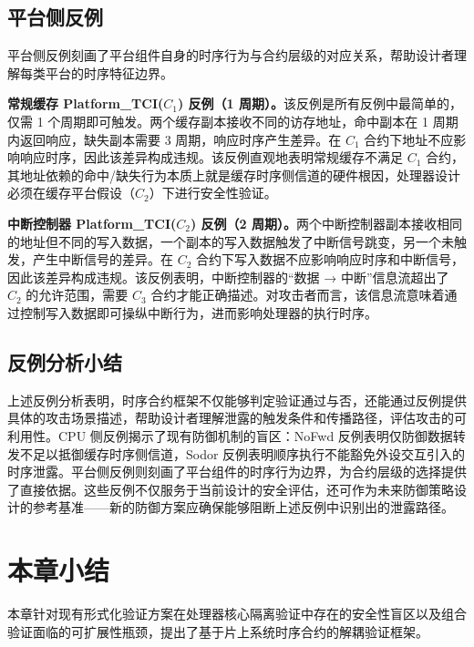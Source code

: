 \subsection{平台侧反例}
\label{subsec:ch4_cex_platform}

平台侧反例刻画了平台组件自身的时序行为与合约层级的对应关系，帮助设计者理解每类平台的时序特征边界。

\textbf{常规缓存 Platform\_TCI($C_1$) 反例（1 周期）。}该反例是所有反例中最简单的，仅需 1 个周期即可触发。两个缓存副本接收不同的访存地址，命中副本在 1 周期内返回响应，缺失副本需要 3 周期，响应时序产生差异。在 $C_1$ 合约下地址不应影响响应时序，因此该差异构成违规。该反例直观地表明常规缓存不满足 $C_1$ 合约，其地址依赖的命中/缺失行为本质上就是缓存时序侧信道的硬件根因，处理器设计必须在缓存平台假设（$C_2$）下进行安全性验证。

\textbf{中断控制器 Platform\_TCI($C_2$) 反例（2 周期）。}两个中断控制器副本接收相同的地址但不同的写入数据，一个副本的写入数据触发了中断信号跳变，另一个未触发，产生中断信号的差异。在 $C_2$ 合约下写入数据不应影响响应时序和中断信号，因此该差异构成违规。该反例表明，中断控制器的``数据 → 中断''信息流超出了 $C_2$ 的允许范围，需要 $C_3$ 合约才能正确描述。对攻击者而言，该信息流意味着通过控制写入数据即可操纵中断行为，进而影响处理器的执行时序。

\subsection{反例分析小结}

上述反例分析表明，时序合约框架不仅能够判定验证通过与否，还能通过反例提供具体的攻击场景描述，帮助设计者理解泄露的触发条件和传播路径，评估攻击的可利用性。CPU 侧反例揭示了现有防御机制的盲区：NoFwd 反例表明仅防御数据转发不足以抵御缓存时序侧信道，Sodor 反例表明顺序执行不能豁免外设交互引入的时序泄露。平台侧反例则刻画了平台组件的时序行为边界，为合约层级的选择提供了直接依据。这些反例不仅服务于当前设计的安全评估，还可作为未来防御策略设计的参考基准——新的防御方案应确保能够阻断上述反例中识别出的泄露路径。


\section{本章小结}
\label{sec:ch4_summary}

本章针对现有形式化验证方案在处理器核心隔离验证中存在的安全性盲区以及组合验证面临的可扩展性瓶颈，提出了基于片上系统时序合约的解耦验证框架。

